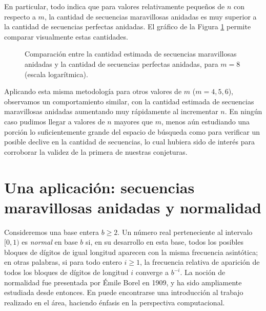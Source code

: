 En particular, todo indica que para valores relativamente pequeños de
$n$ con respecto a $m$, la cantidad de secuencias maravillosas anidadas es
muy superior a la cantidad de secuencias perfectas anidadas. El gráfico
de la Figura \ref{figure:compare-marvellous-perfect} permite comparar
visualmente estas cantidades.

\begin{figure}[H]
	\centering
	\caption{Comparación entre la cantidad estimada de secuencias maravillosas
	anidadas y la cantidad de secuencias perfectas anidadas, para $m = 8$
	(escala logarítmica).}
	\label{figure:compare-marvellous-perfect}
\end{figure}

Aplicando esta misma metodología para otros valores de $m$ ($m = 4, 5, 6$),
observamos un comportamiento similar, con la cantidad estimada de secuencias
maravillosas anidadas aumentando muy rápidamente al incrementar $n$. En ningún
caso pudimos llegar a valores de $n$ mayores que $m$, menos aún estudiando
una porción lo suficientemente grande del espacio de búsqueda como para
verificar un posible declive en la cantidad de secuencias,
lo cual hubiera sido de interés para corroborar la validez de la primera de
nuestras conjeturas.

\chapter{Una aplicación: secuencias maravillosas anidadas y normalidad}
\label{chapter:normality}

Consideremos una base entera $b \geq 2$. Un número real perteneciente al 
intervalo $[0,1)$ es \emph{normal} en base
$b$ si, en su desarrollo en esta base, todos los posibles bloques de dígitos de
igual longitud aparecen con la misma frecuencia asintótica; en otras
palabras, si para todo entero $i \geq 1$, la frecuencia relativa de aparición
de todos los bloques de dígitos de longitud $i$ converge a $b^{-i}$. La noción
de normalidad fue presentada por Émile Borel \cite{borel-normality} en 1909, y
ha sido ampliamente estudiada desde entonces. En \cite{becher-normal-numbers}
puede encontrarse una introducción al trabajo realizado en el área, haciendo
énfasis en la perspectiva computacional.

